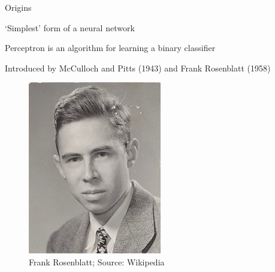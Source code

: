 \documentclass[12pt]{beamer}
\begin{document}
\begin{frame}{Origins}
	
‘Simplest’ form of a neural network

Perceptron is an algorithm for learning a binary classifier

Introduced by McCulloch and Pitts (1943) and Frank Rosenblatt (1958)

\begin{figure}
	\includegraphics[width=0.2\linewidth]{img/220px-Rosenblatt_21.jpg}
	\caption{Frank Rosenblatt; Source: Wikipedia}	
\end{figure}
	

\end{frame}
\end{document}
